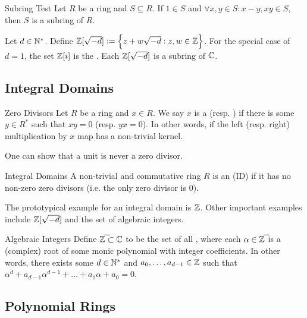 \documentclass{styles/tufte}
\begin{document}
\begin{proposition}{Subring Test}{}
  Let $R$ be a ring and $S \subseteq R$. If $1 \in S$ and $\forall x, y \in S: x - y, xy \in S$, then $S$ is a subring of $R$.
\end{proposition}

\begin{definition}{}{}
  Let $d \in \mathbb{N}^*$. Define $\mathbb{Z}[\sqrt{-d}] := \set{z + w\sqrt{-d}: z, w \in \mathbb{Z}}$. For the special case of $d = 1$, the set $\mathbb{Z}[i]$ is the . Each $\mathbb{Z}[\sqrt{-d}]$ is a subring of $\mathbb{C}$.
\end{definition}


\subsection{Integral Domains}

\begin{definition}{Zero Divisors}{}
  Let $R$ be a ring and $x \in R$. We say $x$ is a  (resp. )  if there is some $y \in R^*$ such that $xy = 0$ (resp. $yx = 0$). In other words, if the left (resp. right) multiplication by $x$ map has a non-trivial kernel.
\end{definition}

One can show that a unit is never a zero divisor.

\begin{definition}{Integral Domains}{}
  A non-trivial and commutative ring $R$ is an  (ID) if it has no non-zero zero divisors (i.e. the only zero divisor is $0$).
\end{definition}

The prototypical example for an integral domain is $\mathbb{Z}$. Other important examples include $\mathbb{Z}[\sqrt{-d}]$ and the set of algebraic integers.

\begin{definition}{Algebraic Integers}{}
  Define $\overline{\ZZ} \subset \CC$ to be the set of all , where each $\alpha \in \overline{\ZZ}$ is a (complex) root of some monic polynomial with integer coefficients. In other words, there exists some $d \in \mathbb{N}^*$ and $a_0, \dots, a_{d-1} \in \mathbb{Z}$ such that $\alpha^d + a_{d-1} \alpha^{d-1} + \dots + a_1 \alpha + a_0 = 0$.
\end{definition}


\subsection{Polynomial Rings}
\end{document}
